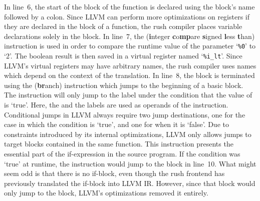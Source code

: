 In line~6, the start of the  block of the  function is declared using the block's name followed by a colon.
Since LLVM can perform more optimizations on registers if they are declared in the  block of a function,
the rush compiler places variable declarations solely in the  block.
In line~7, the  (\textbf{i}nteger \textbf{c}o\textbf{mp}are \textbf{s}igned \textbf{l}ess \textbf{t}han) instruction is used in order to compare the runtime value of the parameter `\texttt{\%0}' to `2'.
The boolean result is then saved in a virtual register named `\texttt{\%i\_lt}'.
Since LLVM's virtual registers may have arbitrary names, the rush compiler uses names which depend on the context of the translation.
In line~8, the block is terminated using the  (\textbf{br}anch) instruction which jumps to the beginning of a basic block.
The instruction will only jump to the  label under the condition that the value of  is `true'.
Here, the  and the  labels are used as operands of the  instruction.
Conditional jumps in LLVM always require two jump destinations, one for the case in which the condition is `true', and one for when it is `false'.
Due to constraints introduced by its internal optimizations, LLVM only allows jumps to target blocks contained in the same function.
This  instruction presents the essential part of the if-expression in the source program.
If the condition was `true' at runtime, the instruction would jump to the  block in line~10.
What might seem odd is that there is no if-block, even though the rush frontend has previously translated the if-block into LLVM IR\@.
However, since that block would only jump to the  block, LLVM's optimizations removed it entirely.

